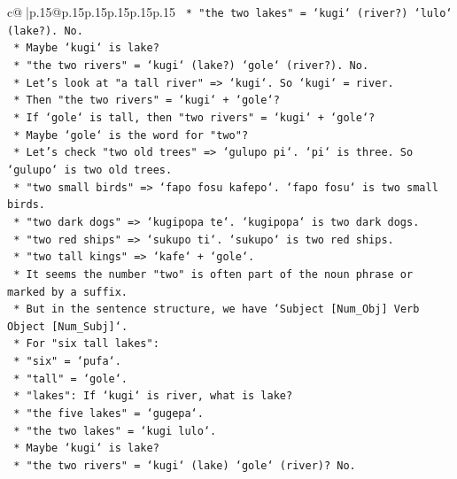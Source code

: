 \documentclass{article}
\begin{document}
{\begin{supertabular}{c@{$\;$}|p{.15\linewidth}@{}p{.15\linewidth}p{.15\linewidth}p{.15\linewidth}p{.15\linewidth}p{.15\linewidth}}
{{{\texttt{                *   "the two lakes" = `kugi` (river?) `lulo` (lake?). No.} \\
\texttt{                *   Maybe `kugi` is lake?} \\
\texttt{                *   "the two rivers" = `kugi` (lake?) `gole` (river?). No.} \\
\texttt{                *   Let's look at "a tall river" => `kugi`. So `kugi` = river.} \\
\texttt{                *   Then "the two rivers" = `kugi` + `gole`?} \\
\texttt{                *   If `gole` is tall, then "two rivers" = `kugi` + `gole`?} \\
\texttt{                *   Maybe `gole` is the word for "two"?} \\
\texttt{                *   Let's check "two old trees" => `gulupo pi`. `pi` is three. So `gulupo` is two old trees.} \\
\texttt{                *   "two small birds" => `fapo fosu kafepo`. `fapo fosu` is two small birds.} \\
\texttt{                *   "two dark dogs" => `kugipopa te`. `kugipopa` is two dark dogs.} \\
\texttt{                *   "two red ships" => `sukupo ti`. `sukupo` is two red ships.} \\
\texttt{                *   "two tall kings" => `kafe` + `gole`.} \\
\texttt{                *   It seems the number "two" is often part of the noun phrase or marked by a suffix.} \\
\texttt{                *   But in the sentence structure, we have `Subject {[}Num\_Obj{]} Verb Object {[}Num\_Subj{]}`.} \\
\texttt{                *   For "six tall lakes":} \\
\texttt{                    *   "six" = `pufa`.} \\
\texttt{                    *   "tall" = `gole`.} \\
\texttt{                    *   "lakes": If `kugi` is river, what is lake?} \\
\texttt{                    *   "the five lakes" = `gugepa`.} \\
\texttt{                    *   "the two lakes" = `kugi lulo`.} \\
\texttt{                    *   Maybe `kugi` is lake?} \\
\texttt{                    *   "the two rivers" = `kugi` (lake) `gole` (river)? No.} \\
}}}
\end{supertabular}}
\end{document}
